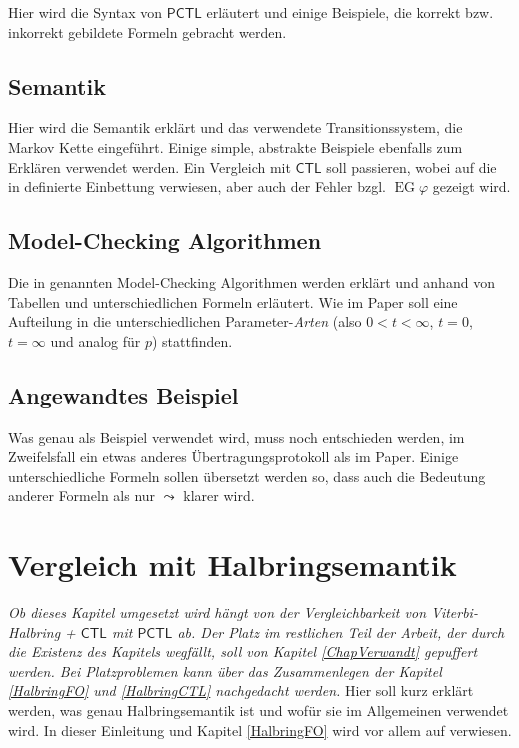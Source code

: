 \documentclass{lni}
\newcommand{\CTL}{\mathsf{CTL}}
\newcommand{\PCTL}{\mathsf{PCTL}}
\begin{document}
Hier wird die Syntax von $\PCTL$ erläutert und einige Beispiele, die korrekt bzw. inkorrekt gebildete Formeln gebracht werden.

\subsection{Semantik}

Hier wird die Semantik erklärt und das verwendete Transitionssystem, die Markov Kette eingeführt. 
Einige simple, abstrakte Beispiele ebenfalls zum Erklären verwendet werden.
Ein Vergleich mit $\CTL$ soll passieren, wobei auf die in \cite{hansson1994logic} definierte Einbettung verwiesen, aber auch der Fehler bzgl. $\operatorname{EG}\varphi$ gezeigt wird.

\subsection{Model-Checking Algorithmen}

Die in \cite{hansson1994logic} genannten Model-Checking Algorithmen werden erklärt und anhand von Tabellen und unterschiedlichen Formeln erläutert.
Wie im Paper soll eine Aufteilung in die unterschiedlichen Parameter-\textit{Arten} (also $0<t<\infty$, $t=0$, $t=\infty$ und analog für $p$) stattfinden.

\subsection{Angewandtes Beispiel}

Was genau als Beispiel verwendet wird, muss noch entschieden werden, im Zweifelsfall ein etwas anderes Übertragungsprotokoll als im Paper.
Einige unterschiedliche Formeln sollen übersetzt werden so, dass auch die Bedeutung anderer Formeln als nur $\leadsto$ klarer wird.

\section{Vergleich mit Halbringsemantik}

\emph{Ob dieses Kapitel umgesetzt wird hängt von der Vergleichbarkeit von Viterbi-Halbring + $\CTL$ mit $\PCTL$ ab. Der Platz im restlichen Teil der Arbeit, der durch die Existenz des Kapitels wegfällt, soll von Kapitel \ref{ChapVerwandt} gepuffert werden. Bei Platzproblemen kann über das Zusammenlegen der Kapitel \ref{HalbringFO} und \ref{HalbringCTL} nachgedacht werden.}
Hier soll kurz erklärt werden, was genau Halbringsemantik ist und wofür sie im Allgemeinen verwendet wird. In dieser Einleitung und Kapitel \ref{HalbringFO} wird vor allem auf \cite{gradel2017semiring} verwiesen.
\end{document}
